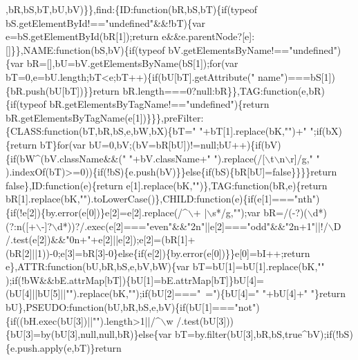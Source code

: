\begin{DoxyCode}
{      ,bR,bS,bT,bU,bV)\}\},find:\{ID:function(bR,bS,bT)\{if(typeof bS.getElementById!=="}undefined\textcolor{stringliteral}{"&&!bT)\{var
       e=bS.getElementById(bR[1]);return e&&e.parentNode?[e]:[]\}\},NAME:function(bS,bV)\{if(typeof bV.getElementsByName!=="}undefined\textcolor{stringliteral}{")\{var
       bR=[],bU=bV.getElementsByName(bS[1]);for(var bT=0,e=bU.length;bT<e;bT++)\{if(bU[bT].getAttribute("}
      name\textcolor{stringliteral}{")===bS[1])\{bR.push(bU[bT])\}\}return bR.length===0?null:bR\}\},TAG:function(e,bR)\{if(typeof
       bR.getElementsByTagName!=="}undefined\textcolor{stringliteral}{")\{return
       bR.getElementsByTagName(e[1])\}\}\},preFilter:\{CLASS:function(bT,bR,bS,e,bW,bX)\{bT="} \textcolor{stringliteral}{"+bT[1].replace(bK,"}\textcolor{stringliteral}{")+"} \textcolor{stringliteral}{";if(bX)\{return bT\}for(var
       bU=0,bV;(bV=bR[bU])!=null;bU++)\{if(bV)\{if(bW^(bV.className&&("} \textcolor{stringliteral}{"+bV.className+"} \textcolor{stringliteral}{").replace(/[\(\backslash\)t\(\backslash\)n\(\backslash\)r]/g,"} \textcolor{stringliteral}{"
      ).indexOf(bT)>=0))\{if(!bS)\{e.push(bV)\}\}else\{if(bS)\{bR[bU]=false\}\}\}\}return false\},ID:function(e)\{return e[1].replace(bK,"}\textcolor{stringliteral}{")\},TAG:function(bR,e)\{return
       bR[1].replace(bK,"}\textcolor{stringliteral}{").toLowerCase()\},CHILD:function(e)\{if(e[1]==="}nth\textcolor{stringliteral}{")\{if(!e[2])\{by.error(e[0])\}e[2]=e[2].replace(/^\(\backslash\)+
      |\(\backslash\)s*/g,"}\textcolor{stringliteral}{");var bR=/(-?)(\(\backslash\)d*)(?:n([+\(\backslash\)-]?\(\backslash\)d*))?/.exec(e[2]==="}even\textcolor{stringliteral}{"&&"}2n\textcolor{stringliteral}{"||e[2]==="}odd\textcolor{stringliteral}{"&&"}2n+1\textcolor{stringliteral}{"||!/\(\backslash\)D
      /.test(e[2])&&"}0n+\textcolor{stringliteral}{"+e[2]||e[2]);e[2]=(bR[1]+(bR[2]||1))-0;e[3]=bR[3]-0\}else\{if(e[2])\{by.error(e[0])\}\}e[0]=bI++;return
       e\},ATTR:function(bU,bR,bS,e,bV,bW)\{var bT=bU[1]=bU[1].replace(bK,"}\textcolor{stringliteral}{"
      );if(!bW&&bE.attrMap[bT])\{bU[1]=bE.attrMap[bT]\}bU[4]=(bU[4]||bU[5]||"}\textcolor{stringliteral}{").replace(bK,"}\textcolor{stringliteral}{");if(bU[2]==="}~=\textcolor{stringliteral}{")\{bU[4]="} \textcolor{stringliteral}{"+bU[4]+"} \textcolor{stringliteral}{"\}return
       bU\},PSEUDO:function(bU,bR,bS,e,bV)\{if(bU[1]==="}not\textcolor{stringliteral}{")\{if((bH.exec(bU[3])||"}\textcolor{stringliteral}{").length>1||/^\(\backslash\)w
      /.test(bU[3]))\{bU[3]=by(bU[3],null,null,bR)\}else\{var bT=by.filter(bU[3],bR,bS,true^bV);if(!bS)\{e.push.apply(e,bT)\}return
}
\end{DoxyCode}

